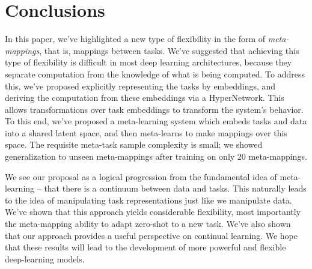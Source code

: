 \documentclass{article}
\begin{document}
\section{Conclusions}
\vspace{-0.5em} %
In this paper, we've highlighted a new type of flexibility in the form of \emph{meta-mappings}, that is, mappings between tasks. We've suggested that achieving this type of flexibility is difficult in most deep learning architectures, because they separate computation from the knowledge of what is being computed. To address this, we've proposed explicitly representing the tasks by embeddings, and deriving the computation from these embeddings via a HyperNetwork. This allows transformations over task embeddings to transform the system's behavior. To this end, we've proposed a meta-learning system which embeds tasks and data into a shared latent space, and then meta-learns to make mappings over this space. The requisite meta-task sample complexity is small; we showed generalization to unseen meta-mappings after training on only 20 meta-mappings.\par
We see our proposal as a logical progression from the fundamental idea of meta-learning -- that there is a continuum between data and tasks. This naturally leads to the idea of manipulating task representations just like we manipulate data. We've shown that this approach yields considerable flexibility, most importantly the meta-mapping ability to adapt zero-shot to a new task. We've also shown that our approach provides a useful perspective on continual learning. We hope that these results will lead to the development of more powerful and flexible deep-learning models. \par




\newpage

\end{document}
